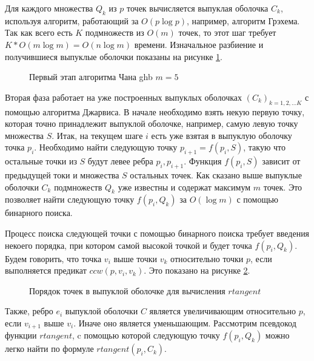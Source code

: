 Для каждого множества $Q_k$ из $p$ точек вычисляется выпуклая оболочка $C_k$, используя алгоритм, работающий за $O(p \log p)$, например, алгоритм Грэхема. Так как всего есть $K$ подмножеств из $O(m)$ точек, то этот шаг требует $K * O(m \log m) = O(n \log m)$ времени. Изначальное разбиение и получившиеся выпуклые оболочки показаны на рисунке \ref{img:chan_1}.

\begin{figure}[H]
	{\centering
		\hfill
		\hfill
		\hfill
	}
	\caption{Первый этап алгоритма Чана ghb $m = 5$}
	\label{img:chan_1}
\end{figure}

Вторая фаза работает на уже построенных выпуклых оболочках $(C_k)_{k=1,2,...K}$ с помощью алгоритма Джарвиса. В начале необходимо взять некую первую точку, которая точно принадлежит выпуклой оболочке, например, самую левую точку множества $S$. Итак, на текущем шаге $i$ есть уже взятая в выпуклую оболочку точка $p_i$. Необходимо найти следующую точку $p_{i + 1} = f(p_i, S)$, такую что остальные точки из $S$ будут левее ребра $p_i, p_{i+1}$. Функция $f(p_i, S)$ зависит от предыдущей токи и множества $S$ остальных точек. Как сказано выше выпуклые оболочки $C_k$ подмножеств $Q_k$ уже известны и содержат максимум $m$ точек. Это позволяет найти следующую точку $f(p_i, Q_k)$ за $O(\log m)$ с помощью бинарного поиска.

Процесс поиска следующей точки с помощью бинарного поиска требует введения некоего порядка, при котором самой высокой точкой и будет точка $f(p_i, Q_k)$. Будем говорить, что точка $v_i$ выше точки $v_k$ относительно точки $p$, если выполняется предикат $ccw(p, v_i, v_k)$. Это показано на рисунке \ref{img:rtangent}.

\begin{figure}[H]
	\centering
	
	\caption{Порядок точек в выпуклой оболочке для вычисления $rtangent$}
	\label{img:rtangent}
\end{figure}

Также, ребро $e_i$ выпуклой оболочки $C$ является увеличивающим относительно $p$, если $v_{i+1}$ выше $v_i$. Иначе оно является уменьшающим\cite{geomal2012tangents}. Рассмотрим псевдокод функции $rtangent$, c помощью которой следующую точку $f(p_i, Q_k)$ можно легко найти по формуле $rtangent(p_i, C_k)$.

